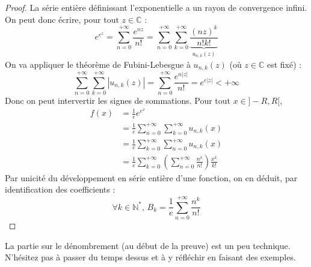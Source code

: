 \begin{proof}
    \medskip
    La série entière définissant l'exponentielle a un rayon de convergence infini. On peut donc écrire, pour tout $z \in \mathbb{C}$ :
    \[ e^{e^z} = \sum_{n=0}^{+\infty} \frac{e^{nz}}{n!} = \sum_{n=0}^{+\infty} \sum_{k=0}^{+\infty} \underbrace{\frac{(nz)^k}{n!k!}}_{u_{n,k}(z)} \]
    On va appliquer le théorème de Fubini-Lebesgue à $u_{n,k}(z)$ (où $z \in \mathbb{C}$ est fixé) :
    \[ \sum_{n=0}^{+\infty} \sum_{k=0}^{+\infty} |u_{n,k}(z)| = \sum_{n=0}^{+\infty} \frac{e^{n|z|}}{n!} = e^{e|z|} < +\infty \]
    Donc on peut intervertir les signes de sommations. Pour tout $x \in ]-R,R[$,
    \begin{align*}
      f(x) &= \frac{1}{e} e^{e^x} \\
      &= \frac{1}{e} \sum_{n=0}^{+\infty} \sum_{k=0}^{+\infty} u_{n,k}(x) \\
      &= \frac{1}{e} \sum_{k=0}^{+\infty} \sum_{n=0}^{+\infty} u_{n,k}(x) \\
      &= \frac{1}{e} \sum_{k=0}^{+\infty} \left( \sum_{n=0}^{+\infty} \frac{n^k}{n!} \right) \frac{x^k}{k!}
    \end{align*}
    Par unicité du développement en série entière d'une fonction, on en déduit, par identification des coefficients :
    \[ \forall k \in \mathbb{N}^*, \, B_k = \frac{1}{e} \sum_{n=0}^{+\infty} \frac{n^k}{n!} \]
  \end{proof}

  \begin{remark}
    La partie sur le dénombrement (au début de la preuve) est un peu technique. N'hésitez pas à passer du temps dessus et à y réfléchir en faisant des exemples.
  \end{remark}

